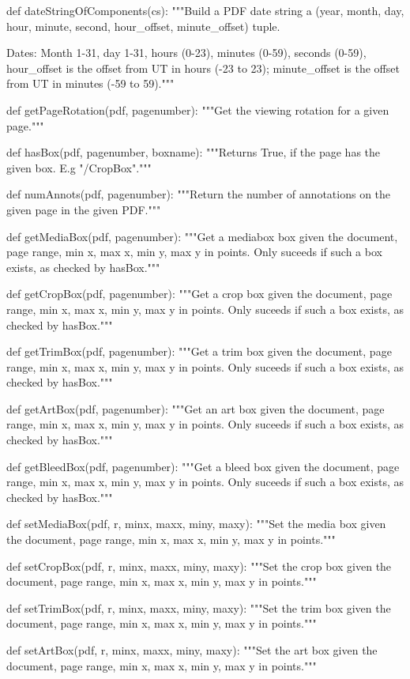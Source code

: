 def dateStringOfComponents(cs):
    """Build a PDF date string a (year, month, day, hour, minute, second,
    hour_offset, minute_offset) tuple.

    Dates: Month 1-31, day 1-31, hours (0-23), minutes (0-59), seconds (0-59),
    hour_offset is the offset from UT in hours (-23 to 23); minute_offset is
    the offset from UT in minutes (-59 to 59)."""

def getPageRotation(pdf, pagenumber):
    """Get the viewing rotation for a given page."""

def hasBox(pdf, pagenumber, boxname):
    """Returns True, if the page has the given box. E.g "/CropBox"."""

def numAnnots(pdf, pagenumber):
    """Return the number of annotations on the given page in the given PDF."""

def getMediaBox(pdf, pagenumber):
    """Get a mediabox box given the document, page range, min x, max x, min y,
    max y in points. Only suceeds if such a box exists, as checked by
    hasBox."""

def getCropBox(pdf, pagenumber):
    """Get a crop box given the document, page range, min x, max x, min y, max
    y in points. Only suceeds if such a box exists, as checked by hasBox."""

def getTrimBox(pdf, pagenumber):
    """Get a trim box given the document, page range, min x, max x, min y, max
    y in points. Only suceeds if such a box exists, as checked by hasBox."""

def getArtBox(pdf, pagenumber):
    """Get an art box given the document, page range, min x, max x, min y, max
    y in points. Only suceeds if such a box exists, as checked by hasBox."""

def getBleedBox(pdf, pagenumber):
    """Get a bleed box given the document, page range, min x, max x, min y, max
    y in points. Only suceeds if such a box exists, as checked by hasBox."""

def setMediaBox(pdf, r, minx, maxx, miny, maxy):
    """Set the media box given the document, page range, min x, max x, min y,
    max y in points."""

def setCropBox(pdf, r, minx, maxx, miny, maxy):
    """Set the crop box given the document, page range, min x, max x, min y,
    max y in points."""

def setTrimBox(pdf, r, minx, maxx, miny, maxy):
    """Set the trim box given the document, page range, min x, max x, min y,
    max y in points."""

def setArtBox(pdf, r, minx, maxx, miny, maxy):
    """Set the art box given the document, page range, min x, max x, min y, max
    y in points."""

